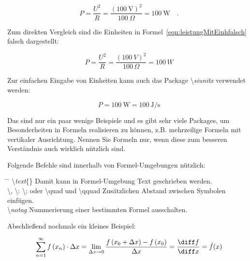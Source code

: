 \begin{equation}
P=\frac{U^2}{R} = \frac{\left( 100~\mathrm{V}\right)^2}{100~\Omega} = 100~\mathrm{W}\quad .
\label{eqn:leistungMitEinh}
\end{equation}

Zum direkten Vergleich sind die Einheiten in Formel~\ref{eqn:leistungMitEinhfalsch} falsch dargestellt:

\begin{equation}
P=\frac{U^2}{R} = \frac{\left( 100~V\right)^2}{100\,\varOmega} = 100\,W
\label{eqn:leistungMitEinhfalsch}
\end{equation}

Zur einfachen Eingabe von Einheiten kann auch das Package \textbackslash \textit{siunitx} verwendet werden:

\begin{equation}
	P=\SI{100}{\watt}=\SI{100}{\joule\per\second}
\end{equation}

Das sind nur ein paar wenige Beispiele und es gibt sehr viele Packages, um Besonderheiten in Formeln realisieren zu können, z.B. mehrzeilige Formeln mit vertikaler Ausrichtung. Nennen Sie Formeln nur, wenn diese zum besseren Verständnis auch wirklich nützlich sind.

Folgende Befehle sind innerhalb von Formel-Umgebungen nützlich:
\begin{tabbing}
	\hspace*{0cm} \= \hspace{0.35\linewidth} \= \+\kill
	\textbackslash \textit{text}\{\}	\> Damit kann in Formel-Umgebung Text geschrieben werden.\\ 
	\textbackslash, \textbackslash: \textbackslash; oder \textbackslash quad und \textbackslash qquad \> Zusätzlichen Abstand zwischen Symbolen einfügen.\\
	\textbackslash \textit{notag} \> Nummerierung einer bestimmten Formel ausschalten.
\end{tabbing}

Abschließend nochmals ein kleines Beispiel:

\begin{eqnarray}
\sum\limits_{n=1}^\infty f\left(x_n\right)\cdot \Delta x=  \lim\limits_{\Delta x \rightarrow 0} \frac{f\left(x_0+\Delta x\right)-f\left(x_0\right)}{\Delta x} = \frac{\diff f}{\diff x} = \dot{f}(x)
\end{eqnarray}